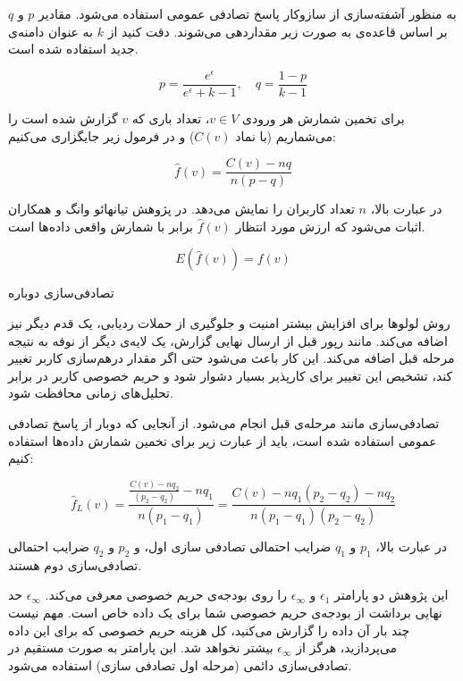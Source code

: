 به منظور آشفته‌سازی از سازوکار پاسخ تصادفی عمومی استفاده می‌شود. مقادیر $p$ و $q$ بر اساس قاعده‌ی  به صورت زیر مقداردهی می‌شوند. دقت کنید از $k$ به عنوان دامنه‌ی جدید استفاده شده است.

\begin{equation}
p = \frac{e^\epsilon}{e^\epsilon + k - 1}, \quad q = \frac{1-p}{k-1}
\label{equ:set-p-q}
\end{equation}

برای تخمین شمارش هر ورودی $v \in V$، تعداد باری که $v$ گزارش شده است را می‌شماریم (با نماد $C(v)$) و در فرمول زیر جایگزاری می‌کنیم:

\begin{equation}
\hat{f}(v) = \frac{C(v) - nq}{n(p - q)}
\end{equation}

در عبارت بالا، $n$ تعداد کاربران را نمایش می‌دهد. در پژوهش تیانهائو وانگ و همکاران  اثبات می‌شود که ارزش مورد انتظار $\hat{f}(v)$ برابر با شمارش واقعی داده‌ها است.

$$E(\hat{f}(v)) = f(v)$$

 تصادفی‌سازی دوباره

روش لولوها برای افزایش بیشتر امنیت و جلوگیری از حملات ردیابی، یک قدم دیگر نیز اضافه می‌کند. مانند رپور قبل از ارسال نهایی گزارش، یک لایه‌ی دیگر از نوفه به نتیجه مرحله قبل اضافه می‌کند. این کار باعث می‌شود حتی اگر مقدار درهم‌سازی کاربر تغییر کند، تشخیص این تغییر برای کارپذیر بسیار دشوار شود و حریم خصوصی کاربر در برابر تحلیل‌های زمانی محافظت شود.

تصادفی‌سازی مانند مرحله‌ی قبل انجام می‌شود. از آنجایی که دوبار از پاسخ تصادفی عمومی استفاده شده است، باید از عبارت زیر برای تخمین شمارش داده‌ها استفاده کنیم:

\begin{equation}
\hat{f}_L(v) = \frac{\frac{C(v) - nq_2}{(p_2 - q_2)} - nq_1}{n(p_1 - q_1)} = \frac{C(v) - nq_1(p_2 - q_2) - nq_2}{n(p_1 - q_1)(p_2 - q_2)}
\label{equ:estimateFrequency}
\end{equation}

در عبارت بالا، $p_1$ و $q_1$ ضرایب احتمالی تصادفی سازی اول، و $p_2$ و $q_2$ ضرایب احتمالی تصادفی‌سازی دوم هستند.


این پژوهش دو پارامتر $\epsilon_1$ و $\epsilon_\infty$ را روی بودجه‌ی حریم خصوصی معرفی می‌کند. $\epsilon_\infty$ حد نهایی برداشت از بودجه‌ی حریم خصوصی شما برای یک داده خاص است. مهم نیست چند بار آن داده‌ را گزارش می‌کنید، کل هزینه حریم خصوصی که برای این داده می‌پردازید، هرگز از $\epsilon_\infty$  بیشتر نخواهد شد. این پارامتر به صورت مستقیم در تصادفی‌سازی دائمی (مرحله اول تصادفی سازی) استفاده می‌شود.

